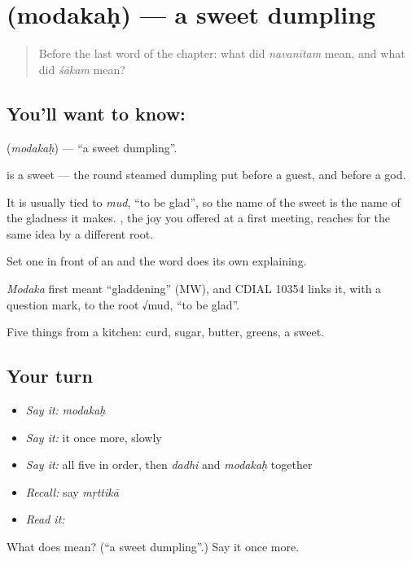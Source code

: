 \section[\texorpdfstring{\sk{मोदकः} (modakaḥ)}{मोदकः (modakaḥ)}]{ (modakaḥ) — a sweet dumpling}

\label{lesson:SA-C40-sweet}



\begin{quote}
Before the last word of the chapter: what did \emph{navanītam} mean, and what did \emph{śākam} mean?
\end{quote}

\subsection*{You'll want to know: }
\textbf{} (\emph{modakaḥ}) — \textquotedblleft{}a sweet dumpling\textquotedblright{}.

\textbf{} is a sweet — the round steamed dumpling put before a guest, and before a god.

It is usually tied to \emph{mud}, \textquotedblleft{}to be glad\textquotedblright{}, so the name of the sweet is the name of the gladness it makes. , the joy you offered at a first meeting, reaches for the same idea by a different root.

Set one in front of an  and the word does its own explaining.

\begin{cousinweb}
\emph{Modaka} first meant \textquotedblleft{}gladdening\textquotedblright{} (MW), and CDIAL 10354 links it, with a question mark, to the root √mud, \textquotedblleft{}to be glad\textquotedblright{}.
\end{cousinweb}

\begin{grammarlens}[title={What you've built}]
Five things from a kitchen: curd, sugar, butter, greens, a sweet.
\end{grammarlens}

\subsection*{Your turn}
\begin{itemize}
\raggedright
  \item \emph{Say it:} \emph{modakaḥ}
  \item \emph{Say it:} it once more, slowly
  \item \emph{Say it:} all five in order, then \emph{dadhi} and \emph{modakaḥ} together
  \item \emph{Recall:} say \emph{mṛttikā}
  \item \emph{Read it:} \textbf{}
\end{itemize}

\begin{tcolorbox}[breakable,colback=teal!4,colframe=teal!35!black,title={Before you move on}]
What does  mean? (\textquotedblleft{}a sweet dumpling\textquotedblright{}.) Say it once more.
\end{tcolorbox}
